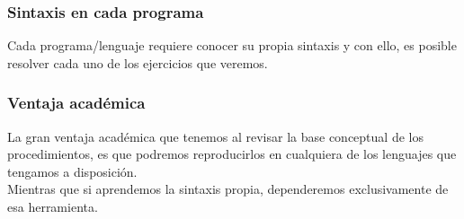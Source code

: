 \documentclass[12pt]{beamer}
\begin{document}
\begin{frame}
\begin{figure}
\end{figure}
\end{frame}
\begin{frame}
\frametitle{Sintaxis en cada programa}
Cada programa/lenguaje requiere conocer su propia sintaxis y con ello, es posible resolver cada uno de los ejercicios que veremos.
\end{frame}
\begin{frame}
\frametitle{Ventaja académica}
La gran ventaja académica que tenemos al revisar la base conceptual de los procedimientos, \pause es que podremos reproducirlos en cualquiera de los lenguajes que tengamos a disposición.
\\
\bigskip
\pause
Mientras que si aprendemos la sintaxis propia, dependeremos exclusivamente de esa herramienta.
\end{frame}
\end{document}
